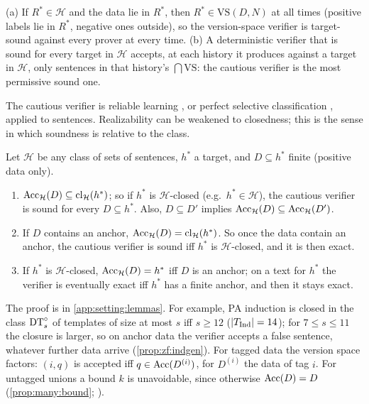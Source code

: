 \begin{theorem}\label{thm:setting:vs}
\textup{(a)} If $R^*\in\mathcal H$ and the data lie in $R^*$, then $R^*\in\mathrm{VS}(D,N)$ at all times (positive labels lie in $R^*$, negative ones outside), so the version-space verifier is target-sound against every prover at every time.
\textup{(b)} A deterministic verifier that is sound for every target in $\mathcal H$ accepts, at each history it produces against a target in $\mathcal H$, only sentences in that history's $\bigcap\mathrm{VS}$: the cautious verifier is the most permissive sound one.
\end{theorem}

The cautious verifier is reliable learning \citep{rivest1988learning}, or perfect selective classification \citep{elyaniv2010foundations}, applied to sentences. Realizability can be weakened to closedness; this is the sense in which soundness is relative to the class.

\begin{lemma}\label{lem:setting:closed}
Let $\mathcal H$ be any class of sets of sentences, $h^*$ a target, and $D\subseteq h^*$ finite (positive data only).
\begin{enumerate}[label=(\alph*)]
\item $\mathrm{Acc}_{\mathcal H}(D)\subseteq\mathrm{cl}_{\mathcal H}(h^*)$; so if $h^*$ is $\mathcal H$-closed (e.g.\ $h^*\in\mathcal H$), the cautious verifier is sound for every $D\subseteq h^*$. Also, $D\subseteq D'$ implies $\mathrm{Acc}_{\mathcal H}(D)\subseteq\mathrm{Acc}_{\mathcal H}(D')$.
\item If $D$ contains an anchor, $\mathrm{Acc}_{\mathcal H}(D)=\mathrm{cl}_{\mathcal H}(h^*)$. So once the data contain an anchor, the cautious verifier is sound iff $h^*$ is $\mathcal H$-closed, and it is then exact.
\item If $h^*$ is $\mathcal H$-closed, $\mathrm{Acc}_{\mathcal H}(D)=h^*$ iff $D$ is an anchor; on a text for $h^*$ the verifier is eventually exact iff $h^*$ has a finite anchor, and then it stays exact.
\end{enumerate}
\end{lemma}

The proof is in \cref{app:setting:lemmas}. For example, PA induction is closed in the class $\mathrm{DT}^{\circ}_s$ of templates of size at most $s$ iff $s\ge12$ ($|T_{\mathrm{Ind}}|=14$); for $7\le s\le11$ the closure is larger, so on anchor data the verifier accepts a false sentence, whatever further data arrive (\cref{prop:zf:indgen}). For tagged data the version space factors: $(i,q)$ is accepted iff $q\in\mathrm{Acc}(D^{(i)})$, for $D^{(i)}$ the data of tag $i$. For untagged unions a bound $k$ is unavoidable, since otherwise $\mathrm{Acc}(D)=D$ (\cref{prop:many:bound}; \citealp{gold1967language}).

